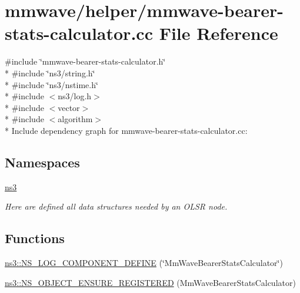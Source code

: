 \hypertarget{mmwave-bearer-stats-calculator_8cc}{}\section{mmwave/helper/mmwave-\/bearer-\/stats-\/calculator.cc File Reference}
\label{mmwave-bearer-stats-calculator_8cc}
{\ttfamily \#include \char`\"{}mmwave-\/bearer-\/stats-\/calculator.\+h\char`\"{}}\\*
{\ttfamily \#include \char`\"{}ns3/string.\+h\char`\"{}}\\*
{\ttfamily \#include \char`\"{}ns3/nstime.\+h\char`\"{}}\\*
{\ttfamily \#include $<$ns3/log.\+h$>$}\\*
{\ttfamily \#include $<$vector$>$}\\*
{\ttfamily \#include $<$algorithm$>$}\\*
Include dependency graph for mmwave-\/bearer-\/stats-\/calculator.cc\+:
\subsection*{Namespaces}
\begin{DoxyCompactItemize}
\item 
 \hyperlink{namespacens3}{ns3}
\begin{DoxyCompactList}\small\item\em Here are defined all data structures needed by an O\+L\+SR node. \end{DoxyCompactList}\end{DoxyCompactItemize}
\subsection*{Functions}
\begin{DoxyCompactItemize}
\item 
\hyperlink{namespacens3_a1c3af31c1ef1187665f8f6cfc0487b92}{ns3\+::\+N\+S\+\_\+\+L\+O\+G\+\_\+\+C\+O\+M\+P\+O\+N\+E\+N\+T\+\_\+\+D\+E\+F\+I\+NE} (\char`\"{}Mm\+Wave\+Bearer\+Stats\+Calculator\char`\"{})
\item 
\hyperlink{namespacens3_aea1e8a2ab5c57d9b7bea51f769b667d0}{ns3\+::\+N\+S\+\_\+\+O\+B\+J\+E\+C\+T\+\_\+\+E\+N\+S\+U\+R\+E\+\_\+\+R\+E\+G\+I\+S\+T\+E\+R\+ED} (Mm\+Wave\+Bearer\+Stats\+Calculator)
\end{DoxyCompactItemize}
